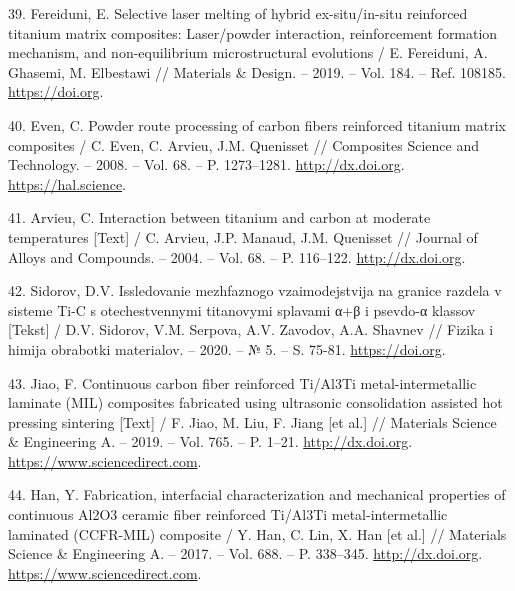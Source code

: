 \begin{references}
39. Fereiduni, E. Selective laser melting of hybrid ex-situ/in-situ
reinforced titanium matrix composites: Laser/powder interaction,
reinforcement formation mechanism, and non-equilibrium microstructural
evo\-lutions / E. Fereiduni, A. Ghasemi, M. Elbestawi // Materials \&
Design. – 2019. – Vol. 184. –
Ref. 108185. \href{https://doi.org/10.1016/j.matdes.2019.108185}{https://doi.org}.

40. Even, C. Powder route processing of carbon fibers reinforced
titanium matrix composites / C. Even, C. Arvieu, J.M. Quenisset //
Composites Science and Technology. – 2008. – Vol. 68. –
P. 1273–1281. \href{http://dx.doi.org/10.1016/j.compscitech.2007.12.014}{http://dx.doi.org}. \href{https://hal.science/hal-00550280v1}{https://hal.science}.

41. Arvieu, C. Interaction between titanium and carbon at moderate
temperatures [Text] / C. Arvieu, J.P. Manaud, J.M. Quenisset //
Journal of Alloys and Compounds. – 2004. – Vol. 68. –
P. 116–122. \href{http://dx.doi.org/10.1016/j.jallcom.2003.08.051}{http://dx.doi.org}.

42. Sidorov, D.V. Issledovanie mezhfaznogo vzaimodejstvija na granice
razdela v sisteme Ti-C s otechestv\-ennymi titanovymi splavami α+β i
psevdo-α klassov [Tekst] / D.V. Sidorov, V.M. Serpova, A.V. Zavodov,
A.A. Shavnev // Fizika i himija obrabotki materialov. – 2020. – № 5. –
S. 75-81. \href{https://doi.org/10.30791/0015-3214-2020-5-75-81}{https://doi.org}.

43. Jiao, F. Continuous carbon fiber reinforced Ti/Al3Ti
metal-intermetallic laminate (MIL) composites fabricated using
ultrasonic consolidation assisted hot pressing sintering [Text] /
F. Jiao, M. Liu, F. Jiang [et al.] // Materials Science \& Engineering
A. – 2019. – Vol. 765. –
P. 1–21. \href{http://dx.doi.org/10.1016/j.msea.2019.138255}{http://dx.doi.org}. \\\href{https://www.sciencedirect.com/science/article/abs/pii/S092150931931041X?via\%3Dihub}{https://www.sciencedirect.com}.

44. Han, Y. Fabrication, interfacial characterization and mechanical
properties of continuous Al2O3 cera\-mic fiber reinforced Ti/Al3Ti
metal-intermetallic laminated (CCFR-MIL) composite / Y. Han, C. Lin,
X. Han [et al.] // Materials Science \& Engineering A. – 2017. –
Vol. 688. –
P. 338–345. \href{http://dx.doi.org/10.1016/j.msea.2017.02.024}{http://dx.doi.org}. \href{https://www.sciencedirect.com/science/article/abs/pii/S0921509317301818?via\%3Dihub}{https://www.sciencedirect.com}.


\end{references}
